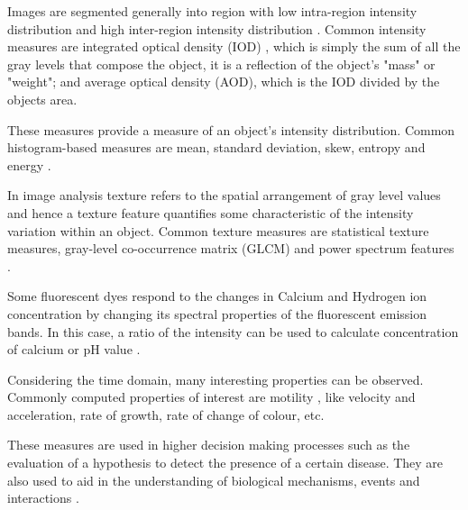 \begin{definition}
	Images are segmented generally into region with low intra-region intensity distribution and high inter-region intensity distribution \citep{Pinkel1986,Meijering2004}.
	Common intensity measures are integrated optical density (IOD) \citep{Loferer1998,Watanabe1991}, which is simply the sum of all the gray levels that compose the object, it is a reflection of  the object's "mass" or "weight"; and average optical density (AOD), which is the IOD divided by the objects area.
\end{definition}

\begin{definition}
	These measures provide a measure of an object's intensity distribution.
	Common histogram-based measures are mean, standard deviation, skew, entropy and energy \citep{Rust2006,Boland2001}.
\end{definition}

\begin{definition}
	In image analysis texture refers to the spatial arrangement of gray level values \citep{Duda2001} and hence a texture feature quantifies some characteristic of the intensity variation within an object.
	Common texture measures are statistical texture measures, gray-level co-occurrence matrix (GLCM) \citep{Atlamazoglou2001,Cicchi2010} and power spectrum features \citep{Erik1999,Xu1996}.
\end{definition}

\begin{definition}
	Some fluorescent dyes respond to the changes in Calcium and Hydrogen ion concentration by changing its spectral properties of the fluorescent emission bands. In this case, a ratio of the intensity can be used to calculate concentration of calcium or pH value \citep{Dobrucki2013}.
\end{definition}

\begin{definition}
	Considering the time domain, many interesting properties can be observed.
	Commonly computed properties of interest are motility \citep{Sekar2003,Miller1869,Mathur2000}, like velocity and acceleration, rate of growth, rate of change of colour, etc.
\end{definition}

These measures are used in higher decision making processes such as the evaluation of a hypothesis to detect the presence of a certain disease. They are also used to aid in the understanding of biological mechanisms, events and interactions \citep{Danek2012}.